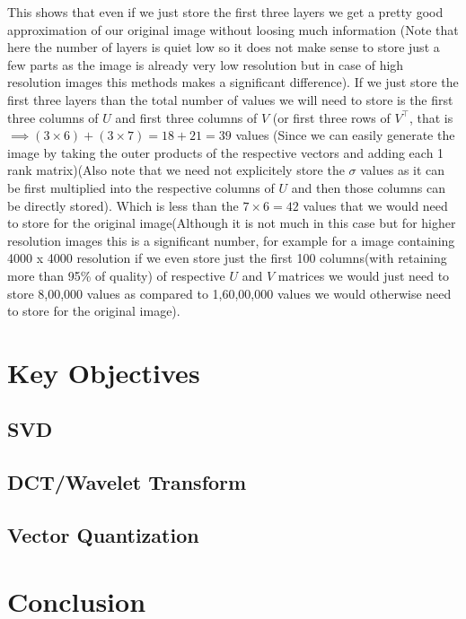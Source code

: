 \documentclass{article}
\begin{document}
This shows that even if we just store the first three layers we get a pretty good approximation of our original image without loosing much information (Note that here the number of layers is quiet low so it does not make sense to store just a few parts as the image is already very low resolution but in case of high resolution images this methods makes a significant difference). If we just store the first three layers than the total number of values we will need to store is the first three columns of $U$ and first three columns of $V$ (or first three rows of $V^{\top}$, that is $\implies (3 \times 6) + (3 \times 7) = 18 + 21 = 39$ values (Since we can easily generate the image by taking the outer products of the respective vectors and adding each 1 rank matrix)(Also note that we need not explicitely store the $\sigma$ values as it can be first multiplied into the respective columns of $U$ and then those columns can be directly stored). Which is less than the $7 \times 6 = 42$ values that we would need to store for the original image(Although it is not much in this case but for higher resolution images this is a significant number, for example for a image containing 4000 x 4000 resolution if we even store just the first 100 columns(with retaining more than 95\% of quality) of respective $U$ and $V$ matrices we would just need to store 8,00,000 values as compared to 1,60,00,000 values we would otherwise need to store for the original image).

\section{Key Objectives}
\subsection{SVD}
\subsection{DCT/Wavelet Transform}
\subsection{Vector Quantization}

\section{Conclusion}
\end{document}
